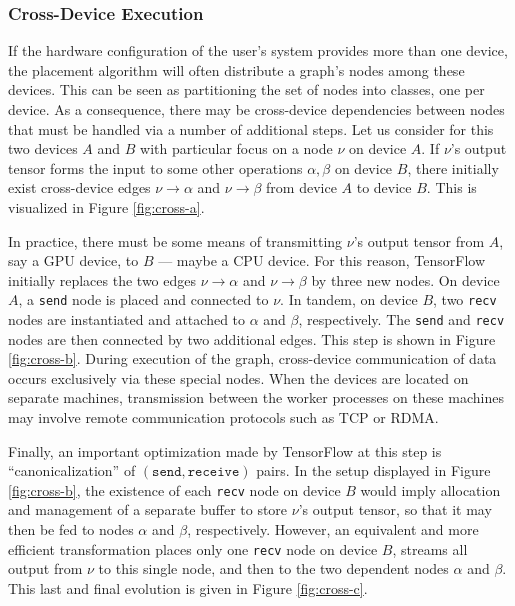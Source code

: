 \subsubsection{Cross-Device Execution}\label{sec:model-exec-single}

If the hardware configuration of the user's system provides more than one
device, the placement algorithm will often distribute a graph's nodes among
these devices. This can be seen as partitioning the set of nodes into classes,
one per device. As a consequence, there may be cross-device dependencies between
nodes that must be handled via a number of additional steps. Let us consider for
this two devices $A$ and $B$ with particular focus on a node $\nu$ on device
$A$. If $\nu$'s output tensor forms the input to some other operations
$\alpha, \beta$ on device $B$, there initially exist cross-device edges
$\nu \rightarrow \alpha$ and $\nu \rightarrow \beta$ from device $A$ to device
$B$. This is visualized in Figure \ref{fig:cross-a}.

In practice, there must be some means of transmitting $\nu$'s output tensor from
$A$, say a GPU device, to $B$ --- maybe a CPU device. For this reason,
TensorFlow initially replaces the two edges $\nu \rightarrow \alpha$ and
$\nu \rightarrow \beta$ by three new nodes. On device $A$, a \texttt{send} node
is placed and connected to $\nu$. In tandem, on device $B$, two \texttt{recv}
nodes are instantiated and attached to $\alpha$ and $\beta$, respectively. The
\texttt{send} and \texttt{recv} nodes are then connected by two additional
edges. This step is shown in Figure \ref{fig:cross-b}. During execution of the
graph, cross-device communication of data occurs exclusively via these special
nodes. When the devices are located on separate machines, transmission between
the worker processes on these machines may involve remote communication
protocols such as TCP or RDMA.

Finally, an important optimization made by TensorFlow at this step is
``canonicalization'' of $(\mathtt{send}, \mathtt{receive})$ pairs. In the setup
displayed in Figure \ref{fig:cross-b}, the existence of each \texttt{recv} node
on device $B$ would imply allocation and management of a separate buffer to
store $\nu$'s output tensor, so that it may then be fed to nodes $\alpha$ and
$\beta$, respectively. However, an equivalent and more efficient transformation
places only one \texttt{recv} node on device $B$, streams all output from $\nu$
to this single node, and then to the two dependent nodes $\alpha$ and
$\beta$. This last and final evolution is given in Figure \ref{fig:cross-c}.

